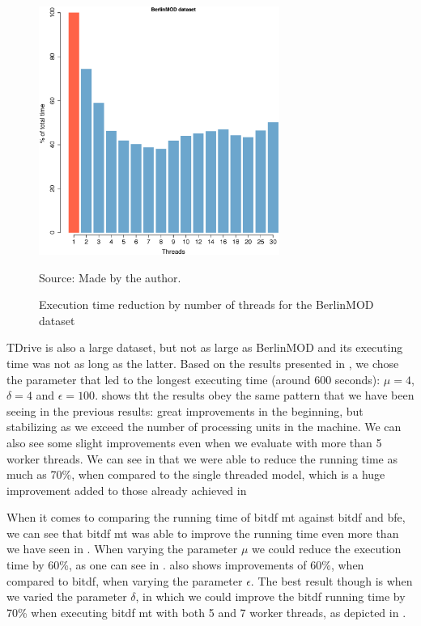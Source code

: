 {\begin{figure}[h!]
    \centering
    \caption{Execution time reduction by number of threads for the BerlinMOD dataset}
    \centerline{\includegraphics[width=0.7\textwidth]{images/BerlinMOD_thread.eps}}
    \footnotesize{Source: Made by the author.}
    \label{fig:berlinmod_threads}
\end{figure}

TDrive is also a large dataset, but not as large as BerlinMOD and its executing time was not as long as the latter.
Based on the results presented in , we chose the parameter that led to the longest executing time
(around 600 seconds): $\mu=4$, $\delta=4$ and $\epsilon=100$.  shows tht the results obey the
same pattern that we have been seeing in the previous results: great improvements in the beginning, but stabilizing as
we exceed the number of processing units in the machine. We can also see some slight improvements even when we evaluate
with more than 5 worker threads. We can see in  that we were able to reduce the running time
as much as 70\%, when compared to the single threaded model, which is a huge improvement added to those already achieved
in 

When it comes to comparing the running time of \ac{bitdf} \ac{mt} against \ac{bitdf} and \ac{bfe}, we can see that
\ac{bitdf} \ac{mt} was able to improve the running time even more than we have seen in . When varying
the parameter $\mu$ we could reduce the execution time by 60\%, as one can see in .
 also shows improvements of 60\%, when compared to \ac{bitdf}, when varying the
parameter $\epsilon$. The best result though is when we varied the parameter $\delta$, in which we could improve the
\ac{bitdf} running time by 70\% when executing \ac{bitdf} \ac{mt} with both 5 and 7 worker threads, as depicted in
.

}

